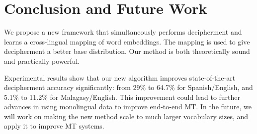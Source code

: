 \section{Conclusion and Future Work}

We propose a new framework that simultaneously performs decipherment and learns a cross-lingual mapping of word embeddings. The mapping is used to give decipherment a better base distribution. Our method is both theoretically sound and practically powerful. 

Experimental results show that our new algorithm improves state-of-the-art decipherment accuracy significantly: from 29\% to 64.7\% for Spanish/English, and 5.1\% to 11.2\% for Malagasy/English. This improvement could lead to further advances in using monolingual data to improve end-to-end MT.
In the future, we will work on making the new method scale to much larger vocabulary sizes, and apply it to improve MT systems.